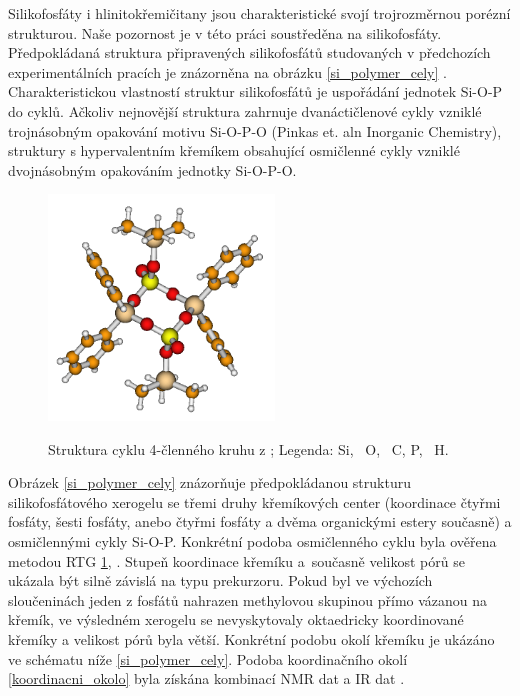 \documentclass[
digital, %
table,   %
lof,     %
lot,     %
oneside,
]{fithesis3}
\begin{document}
Silikofosfáty i hlinitokřemičitany jsou charakteristické svojí trojrozměrnou  porézní strukturou. Naše pozornost je v této práci soustředěna na silikofosfáty. Předpokládaná struktura připravených silikofosfátů studovaných v předchozích experimentálních pracích je znázorněna na obrázku \ref{si_polymer_cely} \cite{Styskalik2015thesis}. Charakteristickou vlastností struktur silikofosfátů je uspořádání jednotek Si-O-P do cyklů. Ačkoliv nejnovější struktura zahrnuje dvanáctičlenové cykly vzniklé trojnásobným opakování motivu Si-O-P-O (Pinkas et. aln Inorganic Chemistry), struktury s hypervalentním křemíkem obsahující osmičlenné cykly vzniklé dvojnásobným opakováním jednotky Si-O-P-O.
\begin{figure}
\caption{Struktura cyklu 4-členného kruhu z \cite{C4TA06823H};  Legenda:  Si, ~O, ~C,  P, ~H.}
\center \includegraphics[width=6cm]{rtg_kruh_samostatne.png} \label{rtg_cyklus} \end{figure}
Obrázek \ref{si_polymer_cely} znázorňuje předpokládanou strukturu silikofosfátového xerogelu se třemi druhy křemíkových center (koordinace čtyřmi fosfáty, šesti fosfáty, anebo čtyřmi fosfáty a dvěma organickými estery současně) a osmičlennými cykly Si-O-P.  Konkrétní podoba osmičlenného cyklu byla ověřena metodou RTG \ref{rtg_cyklus}, \cite{C4TA06823H}. Stupeň koordinace křemíku a~současně velikost pórů se ukázala být silně závislá na typu prekurzoru. Pokud byl ve výchozích sloučeninách jeden z fosfátů nahrazen methylovou skupinou přímo vázanou na křemík, ve výsledném xerogelu se nevyskytovaly oktaedricky koordinované křemíky a velikost pórů byla větší. Konkrétní podobu okolí křemíku je ukázáno ve schématu níže \ref{si_polymer_cely}. Podoba koordinačního okolí \ref{koordinacni_okolo} byla získána kombinací NMR dat a IR dat \cite{C4TA06823H} \cite{Styskalik2015thesis}.
\end{document}
